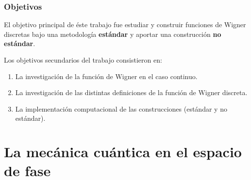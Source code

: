 \documentclass[10pt,spanish]{beamer}
\begin{document}
  \begin{frame}
    \frametitle{Objetivos}

    El objetivo principal de éste trabajo fue estudiar y
    construir funciones de Wigner discretas bajo una
    metodología \textbf{estándar} y aportar una construcción
    \textbf{no estándar}.

    \vspace{10pt}

    \pause

    Los objetivos secundarios del trabajo consistieron en:
    \begin{enumerate}
      \item La investigación de la función de Wigner en
        el caso continuo.
      \item La investigación de las distintas definiciones
        de la función de Wigner discreta.
      \item La implementación computacional de las
        construcciones (estándar y no estándar).
    \end{enumerate}
  \end{frame}


  \section{La mecánica cuántica en el espacio de fase}




\end{document}
